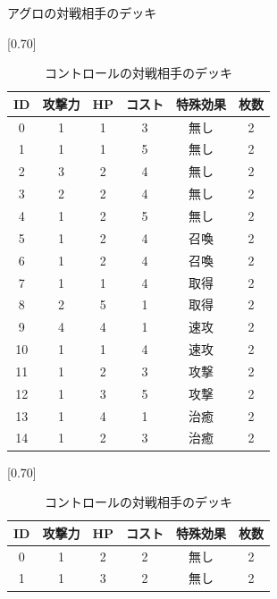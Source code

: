 \documentclass[12pt]{jarticle}
\begin{document}
    \begin{table}[htbp]
      \begin{minipage}[c]{0.5\hsize}
        \centering
        \caption{アグロの対戦相手のデッキ}
        \label{table:agurodeck}
        \vspace{-0.3cm}
        \scalebox{0.70}[0.70]{
          \begin{tabular}{|c|c|c|c|c|c|}
            \hline
            ID & 攻撃力 & HP & コスト & 特殊効果 & 枚数 \\ \hline \hline
            0 & 1 & 1 & 3 & 無し & 2 \\ \hline
            1 & 1 & 1 & 5 & 無し & 2 \\ \hline
            2 & 3 & 2 & 4 & 無し & 2 \\ \hline
            3 & 2 & 2 & 4 & 無し & 2 \\ \hline
            4 & 1 & 2 & 5 & 無し & 2 \\ \hline
            5 & 1 & 2 & 4 & 召喚 & 2 \\ \hline
            6 & 1 & 2 & 4 & 召喚 & 2 \\ \hline
            7 & 1 & 1 & 4 & 取得 & 2 \\ \hline
            8 & 2 & 5 & 1 & 取得 & 2 \\ \hline
            9 & 4 & 4 & 1 & 速攻 & 2 \\ \hline
            10 & 1 & 1 & 4 & 速攻 & 2 \\ \hline
            11 & 1 & 2 & 3 & 攻撃 & 2 \\ \hline
            12 & 1 & 3 & 5 & 攻撃 & 2 \\ \hline
            13 & 1 & 4 & 1 & 治癒 & 2 \\ \hline
            14 & 1 & 2 & 3 & 治癒 & 2 \\ \hline
            \end{tabular}
        }
      \end{minipage}
      \begin{minipage}[c]{0.5\hsize}
        \centering
        \caption{コントロールの対戦相手のデッキ}
        \label{table:controlldeck}
        \vspace{-0.3cm}
        \scalebox{0.70}[0.70]{
          \begin{tabular}{|c|c|c|c|c|c|}
            \hline
            ID & 攻撃力 & HP & コスト & 特殊効果 & 枚数 \\ \hline \hline
            0 & 1 & 2 & 2 & 無し & 2 \\ \hline
            1 & 1 & 3 & 2 & 無し & 2 \\ \hline

\end{tabular}}
\end{minipage}
\end{table}
\end{document}
